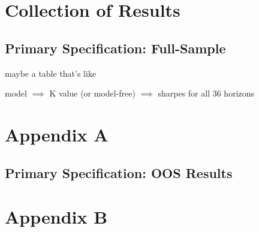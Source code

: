 \documentclass{article}
\begin{document}
\newpage

\section{Collection of Results}

\listoffigures

\listoftables

\newpage

\subsection{Primary Specification: Full-Sample}



maybe a table that's like 

model $\implies$ K value (or model-free) $\implies$ sharpes for all 36 horizons







\newpage

\section{Appendix A}

\subsection{Primary Specification: OOS Results}

    







\newpage


\section{Appendix B}


\end{document}
